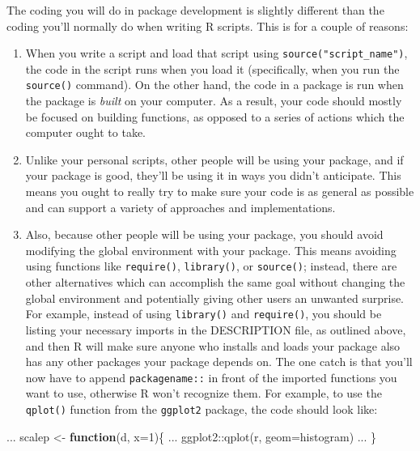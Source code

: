 \documentclass[
]{book}
\newenvironment{Shaded}{\begin{snugshade}}{\end{snugshade}}
\newcommand{\AttributeTok}[1]{\textcolor[rgb]{0.77,0.63,0.00}{#1}}
\newcommand{\ControlFlowTok}[1]{\textcolor[rgb]{0.13,0.29,0.53}{\textbf{#1}}}
\newcommand{\DecValTok}[1]{\textcolor[rgb]{0.00,0.00,0.81}{#1}}
\newcommand{\FunctionTok}[1]{\textcolor[rgb]{0.00,0.00,0.00}{#1}}
\newcommand{\NormalTok}[1]{#1}
\newcommand{\OtherTok}[1]{\textcolor[rgb]{0.56,0.35,0.01}{#1}}
\newcommand{\SpecialCharTok}[1]{\textcolor[rgb]{0.00,0.00,0.00}{#1}}
\newcommand{\StringTok}[1]{\textcolor[rgb]{0.31,0.60,0.02}{#1}}
\providecommand{\tightlist}{%
  \setlength{\itemsep}{0pt}\setlength{\parskip}{0pt}}
\begin{document}
The coding you will do in package development is slightly different than the coding you'll normally do when writing R scripts. This is for a couple of reasons:

\begin{enumerate}
\def\labelenumi{\arabic{enumi}.}
\tightlist
\item
  When you write a script and load that script using \texttt{source("script\_name")}, the code in the script runs when you load it (specifically, when you run the \texttt{source()} command). On the other hand, the code in a package is run when the package is \emph{built} on your computer. As a result, your code should mostly be focused on building functions, as opposed to a series of actions which the computer ought to take.
\item
  Unlike your personal scripts, other people will be using your package, and if your package is good, they'll be using it in ways you didn't anticipate. This means you ought to really try to make sure your code is as general as possible and can support a variety of approaches and implementations.
\item
  Also, because other people will be using your package, you should avoid modifying the global environment with your package. This means avoiding using functions like \texttt{require()}, \texttt{library()}, or \texttt{source()}; instead, there are other alternatives which can accomplish the same goal without changing the global environment and potentially giving other users an unwanted surprise. For example, instead of using \texttt{library()} and \texttt{require()}, you should be listing your necessary imports in the DESCRIPTION file, as outlined above, and then R will make sure anyone who installs and loads your package also has any other packages your package depends on. The one catch is that you'll now have to append \texttt{packagename::} in front of the imported functions you want to use, otherwise R won't recognize them. For example, to use the \texttt{qplot()} function from the \texttt{ggplot2} package, the code should look like:
\end{enumerate}

\begin{Shaded}
\begin{Highlighting}[]
\NormalTok{ ...}
\NormalTok{scalep }\OtherTok{\textless{}{-}} \ControlFlowTok{function}\NormalTok{(d, }\AttributeTok{x=}\DecValTok{1}\NormalTok{)\{}
\NormalTok{ ...}
\NormalTok{  ggplot2}\SpecialCharTok{::}\FunctionTok{qplot}\NormalTok{(r, }\AttributeTok{geom=}\StringTok{\textquotesingle{}histogram\textquotesingle{}}\NormalTok{)}
\NormalTok{ ...}
\NormalTok{\}}
\end{Highlighting}
\end{Shaded}
\end{document}
